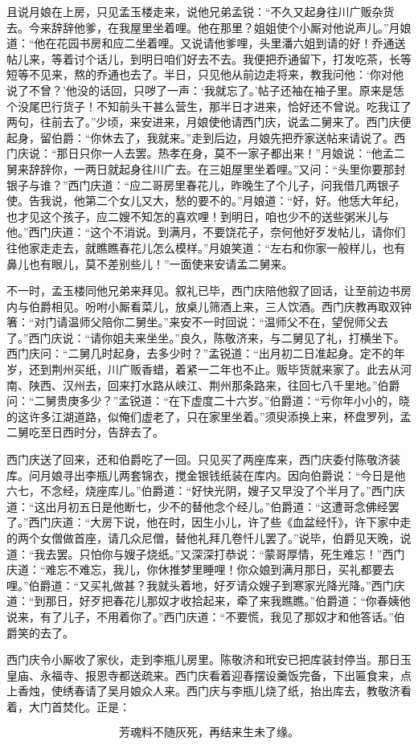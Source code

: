 且说月娘在上房，只见孟玉楼走来，说他兄弟孟锐：“不久又起身往川广贩杂货去。今来辞辞他爹，在我屋里坐着哩。他在那里？姐姐使个小厮对他说声儿。”月娘道：“他在花园书房和应二坐着哩。又说请他爹哩，头里潘六姐到请的好！乔通送帖儿来，等着讨个话儿，到明日咱们好去不去。我便把乔通留下，打发吃茶，长等短等不见来，熬的乔通也去了。半日，只见他从前边走将来，教我问他：‘你对他说了不曾？’他没的话回，只哕了一声：‘我就忘了。’帖子还袖在袖子里。原来是恁个没尾巴行货子！不知前头干甚么营生，那半日才进来，恰好还不曾说。吃我讧了两句，往前去了。”少顷，来安进来，月娘使他请西门庆，说孟二舅来了。西门庆便起身，留伯爵：“你休去了，我就来。”走到后边，月娘先把乔家送帖来请说了。西门庆说：“那日只你一人去罢。热孝在身，莫不一家子都出来！”月娘说：“他孟二舅来辞辞你，一两日就起身往川广去。在三姐屋里坐着哩。”又问：“头里你要那封银子与谁？”西门庆道：“应二哥房里春花儿，昨晚生了个儿子，问我借几两银子使。告我说，他第二个女儿又大，愁的要不的。”月娘道：“好，好。他恁大年纪，也才见这个孩子，应二嫂不知怎的喜欢哩！到明日，咱也少不的送些粥米儿与他。”西门庆道：“这个不消说。到满月，不要饶花子，奈何他好歹发帖儿，请你们往他家走走去，就瞧瞧春花儿怎么模样。”月娘笑道：“左右和你家一般样儿，也有鼻儿也有眼儿，莫不差别些儿！”一面使来安请孟二舅来。

不一时，孟玉楼同他兄弟来拜见。叙礼已毕，西门庆陪他叙了回话，让至前边书房内与伯爵相见。吩咐小厮看菜儿，放桌儿筛酒上来，三人饮酒。西门庆教再取双钟箸：“对门请温师父陪你二舅坐。”来安不一时回说：“温师父不在，望倪师父去了。”西门庆说：“请你姐夫来坐坐。”良久，陈敬济来，与二舅见了礼，打横坐下。西门庆问：“二舅几时起身，去多少时？”孟锐道：“出月初二日准起身。定不的年岁，还到荆州买纸，川广贩香蜡，着紧一二年也不止。贩毕货就来家了。此去从河南、陕西、汉州去，回来打水路从峡江、荆州那条路来，往回七八千里地。”伯爵问：“二舅贵庚多少？”孟锐道：“在下虚度二十六岁。”伯爵道：“亏你年小小的，晓的这许多江湖道路，似俺们虚老了，只在家里坐着。”须臾添换上来，杯盘罗列，孟二舅吃至日西时分，告辞去了。

西门庆送了回来，还和伯爵吃了一回。只见买了两座库来，西门庆委付陈敬济装库。问月娘寻出李瓶儿两套锦衣，搅金银钱纸装在库内。因向伯爵说：“今日是他六七，不念经，烧座库儿。”伯爵道：“好快光阴，嫂子又早没了个半月了。”西门庆道：“这出月初五日是他断七，少不的替他念个经儿。”伯爵道：“这遭哥念佛经罢了。”西门庆道：“大房下说，他在时，因生小儿，许了些《血盆经忏》，许下家中走的两个女僧做首座，请几众尼僧，替他礼拜几卷忏儿罢了。”说毕，伯爵见天晚，说道：“我去罢。只怕你与嫂子烧纸。”又深深打恭说：“蒙哥厚情，死生难忘！”西门庆道：“难忘不难忘，我儿，你休推梦里睡哩！你众娘到满月那日，买礼都要去哩。”伯爵道：“又买礼做甚？我就头着地，好歹请众嫂子到寒家光降光降。”西门庆道：“到那日，好歹把春花儿那奴才收拾起来，牵了来我瞧瞧。”伯爵道：“你春姨他说来，有了儿子，不用着你了。”西门庆道：“不要慌，我见了那奴才和他答话。”伯爵笑的去了。

西门庆令小厮收了家伙，走到李瓶儿房里。陈敬济和玳安已把库装封停当。那日玉皇庙、永福寺、报恩寺都送疏来。西门庆看着迎春摆设羹饭完备，下出匾食来，点上香烛，使绣春请了吴月娘众人来。西门庆与李瓶儿烧了纸，抬出库去，教敬济看着，大门首焚化。正是：

\[
芳魂料不随灰死，再结来生未了缘。
\]
